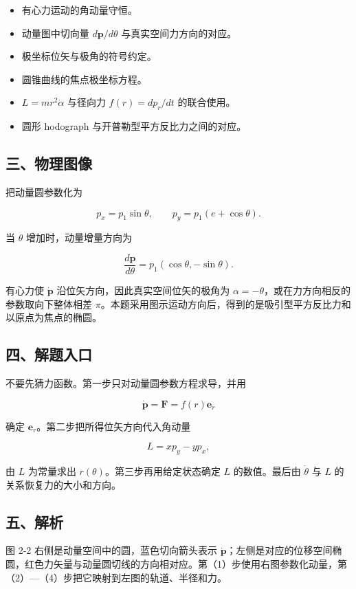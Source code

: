 \documentclass[12pt,a4paper,UTF8]{ctexart}
\newcommand{\tightlist}{\setlength{\itemsep}{0pt}\setlength{\parskip}{0pt}}
\begin{document}
\begin{itemize}
\tightlist
\item
  有心力运动的角动量守恒。
\item
  动量图中切向量 \(d\bm p/d\theta\) 与真实空间力方向的对应。
\item
  极坐标位矢与极角的符号约定。
\item
  圆锥曲线的焦点极坐标方程。
\item
  \(L=mr^2\dot\alpha\) 与径向力 \(f(r)=dp_r/dt\) 的联合使用。
\item
  圆形 hodograph 与开普勒型平方反比力之间的对应。
\end{itemize}

\subsection{三、物理图像}\label{ux4e09ux7269ux7406ux56feux50cf-1}

把动量圆参数化为

\[p_x=p_1\sin\theta,\qquad p_y=p_1(e+\cos\theta).\]

当 \(\theta\) 增加时，动量增量方向为

\[\frac{d\bm p}{d\theta}=p_1(\cos\theta,-\sin\theta).\]

有心力使 \(\dot{\bm p}\) 沿位矢方向，因此真实空间位矢的极角为
\(\alpha=-\theta\)，或在力方向相反的参数取向下整体相差
\(\pi\)。本题采用图示运动方向后，得到的是吸引型平方反比力和以原点为焦点的椭圆。

\subsection{四、解题入口}\label{ux56dbux89e3ux9898ux5165ux53e3-1}

不要先猜力函数。第一步只对动量圆参数方程求导，并用

\[\dot{\bm p}=\bm F=f(r)\bm e_r\]

确定 \(\bm e_r\)。第二步把所得位矢方向代入角动量

\[L=xp_y-yp_x,\]

由 \(L\) 为常量求出 \(r(\theta)\)。第三步再用给定状态确定 \(L\)
的数值。最后由 \(\dot\theta\) 与 \(L\) 的关系恢复力的大小和方向。

\subsection{五、解析}\label{ux4e94ux89e3ux6790-1}

图 2-2 右侧是动量空间中的圆，蓝色切向箭头表示
\(\dot{\bm p}\)；左侧是对应的位移空间椭圆，红色力矢量与动量圆切线的方向相对应。第（1）步使用右图参数化动量，第（2）---（4）步把它映射到左图的轨道、半径和力。
\end{document}
